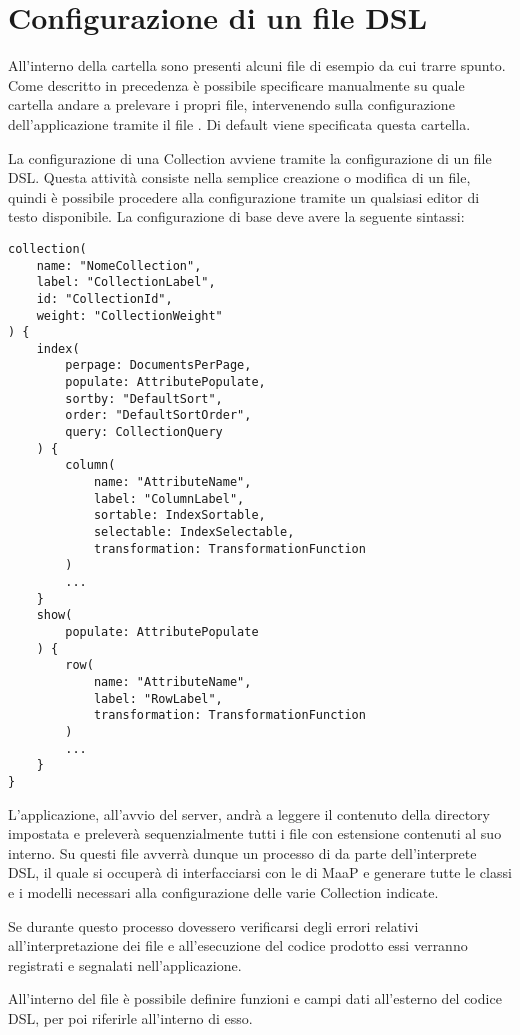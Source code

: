 \section{Configurazione di un file DSL}
\label{collection}

All'interno della cartella  sono presenti alcuni file  di esempio da cui trarre spunto. Come descritto in precedenza è possibile specificare manualmente su quale cartella andare a prelevare i propri file, intervenendo sulla configurazione dell'applicazione tramite il file . Di default viene specificata questa cartella.

La configurazione di una Collection avviene tramite la configurazione di un file DSL. Questa attività consiste nella semplice creazione o modifica di un file, quindi è possibile procedere alla configurazione tramite un qualsiasi editor di testo disponibile. La configurazione di base deve avere la seguente sintassi:
\medskip

\begin{lstlisting}
collection(
	name: "NomeCollection", 
	label: "CollectionLabel", 
	id: "CollectionId", 
	weight: "CollectionWeight" 
) {
	index( 
		perpage: DocumentsPerPage, 
		populate: AttributePopulate, 
		sortby: "DefaultSort", 
		order: "DefaultSortOrder", 
		query: CollectionQuery
	) {
		column(
			name: "AttributeName", 
			label: "ColumnLabel", 
			sortable: IndexSortable, 
			selectable: IndexSelectable, 
			transformation: TransformationFunction
		)
		...
	}
	show(
		populate: AttributePopulate
	) {
		row(
			name: "AttributeName", 
			label: "RowLabel", 
			transformation: TransformationFunction
		)
		...
	}
} 
\end{lstlisting}


L'applicazione, all'avvio del server, andrà a leggere il contenuto della directory impostata e preleverà sequenzialmente tutti i file con estensione  contenuti al suo interno. Su questi file avverrà dunque un processo di  da parte dell'interprete DSL, il quale si occuperà di interfacciarsi con le  di MaaP e generare tutte le classi e i modelli necessari alla configurazione delle varie Collection indicate. 

Se durante questo processo dovessero verificarsi degli errori relativi all'interpretazione dei file e all'esecuzione del codice prodotto essi verranno registrati e segnalati nell'applicazione.

All'interno del file è possibile definire funzioni e campi dati all'esterno del codice DSL, per poi riferirle all'interno di esso.


